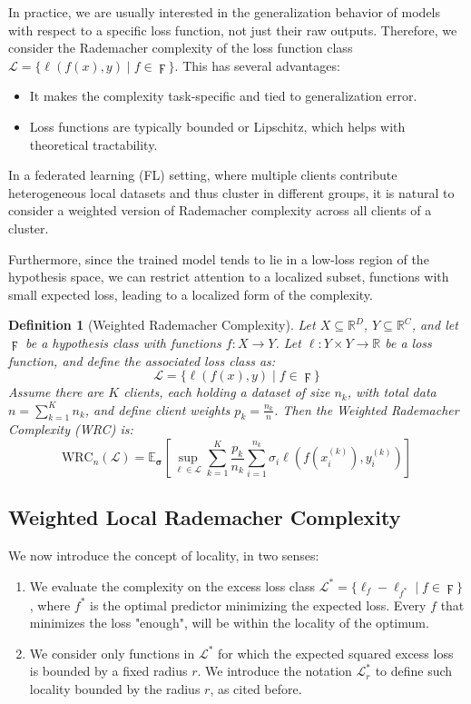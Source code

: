 \documentclass{article}
\newtheorem{definition}{Definition}
\begin{document}
In practice, we are usually interested in the generalization behavior of models with respect to a specific loss function, not just their raw outputs. Therefore, we consider the Rademacher complexity of the loss function class \( \mathcal{L} = \{ \ell(f(x), y) \mid f \in \digamma \} \). This has several advantages:
\begin{itemize}
    \item It makes the complexity task-specific and tied to generalization error.
    \item Loss functions are typically bounded or Lipschitz, which helps with theoretical tractability.
\end{itemize}

In a federated learning (FL) setting, where multiple clients contribute heterogeneous local datasets and thus cluster in different groups, it is natural to consider a weighted version of Rademacher complexity across all clients of a cluster.

Furthermore, since the trained model tends to lie in a low-loss region of the hypothesis space, we can restrict attention to a localized subset, functions with small expected loss, leading to a localized form of the complexity.

\begin{definition}[Weighted Rademacher Complexity]
Let \( X \subseteq \mathbb{R}^D \), \( Y \subseteq \mathbb{R}^C \), and let \( \digamma \) be a hypothesis class with functions \( f: X \to Y \). Let \( \ell: Y \times Y \to \mathbb{R} \) be a loss function, and define the associated loss class as:
\[
\mathcal{L} = \{ \ell(f(x), y) \mid f \in \digamma \}
\]
Assume there are \( K \) clients, each holding a dataset of size \( n_k \), with total data \( n = \sum_{k=1}^K n_k \), and define client weights \( p_k = \frac{n_k}{n} \). Then the \emph{Weighted Rademacher Complexity (WRC)} is:
\[
\text{WRC}_n(\mathcal{L}) = \mathbb{E}_{\boldsymbol{\sigma}} \left[ \sup_{\ell \in \mathcal{L}} \sum_{k=1}^{K} \frac{p_k}{n_k} \sum_{i=1}^{n_k} \sigma_i \ell(f(x_i^{(k)}), y_i^{(k)}) \right]
\]

\end{definition}

\subsection{Weighted Local Rademacher Complexity}

We now introduce the concept of locality, in two senses:
\begin{enumerate}
    \item We evaluate the complexity on the excess loss class \( \mathcal{L}^* = \{ \ell_f - \ell_{f^*} \mid f \in \digamma \} \), where \( f^* \) is the optimal predictor minimizing the expected loss. Every $f$ that minimizes the loss "enough", will be within the locality of the optimum.
    \item We consider only functions in \( \mathcal{L}^* \) for which the expected squared excess loss is bounded by a fixed radius \( r \). We introduce the notation $\mathcal{L}_r^*$ to define such locality bounded by the radius \( r \), as cited before.
\end{enumerate}
\end{document}
